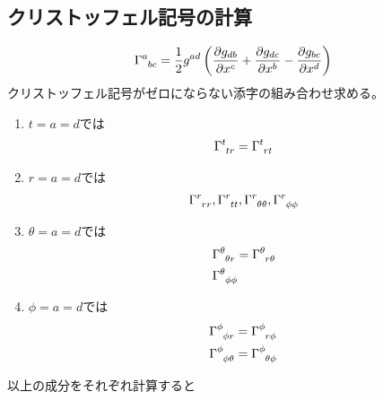 \documentclass[dvipdfmx]{report} %
\begin{document}
\subsection{クリストッフェル記号の計算}
\[
\tensor{\Gamma}{^a_{bc}} =
	\frac{1}{2}g^{ad}\left( \frac{\partial g_{db}}{\partial x^c}
	+ \frac{\partial g_{dc}}{\partial x^b}
	- \frac{\partial g_{bc}}{\partial x^d} \right)
\]
クリストッフェル記号がゼロにならない添字の組み合わせ求める。
\begin{enumerate}[(1)\,]
\item{$t=a=d$では}
\begin{equation*}
\begin{split}
	\tensor{\Gamma}{^t_{tr}} = \tensor{\Gamma}{^t_{rt}}
\end{split}
\end{equation*}
\item{$r=a=d$では}
\begin{equation*}
\begin{split}
	\tensor{\Gamma}{^r_{rr}}, \tensor{\Gamma}{^r_{tt}},
	\tensor{\Gamma}{^r_{\theta\theta}}, \tensor{\Gamma}{^r_{\phi\phi}}\\
\end{split}
\end{equation*}
\item{$\theta=a=d$では}
\begin{equation*}
\begin{split}
	&\tensor{\Gamma}{^\theta_{\theta r}} = \tensor{\Gamma}{^\theta_{r \theta}}\\
	&\tensor{\Gamma}{^\theta_{\phi \phi}}
\end{split}
\end{equation*}
\item{$\phi=a=d$では}
\begin{equation*}
\begin{split}
	&\tensor{\Gamma}{^\phi_{\phi r}} = \tensor{\Gamma}{^\phi_{r \phi}}\\
	&\tensor{\Gamma}{^\phi_{\phi \theta}} = \tensor{\Gamma}{^\phi_{\theta \phi}}
\end{split}
\end{equation*}
\end{enumerate}
以上の成分をそれぞれ計算すると
\end{document}
